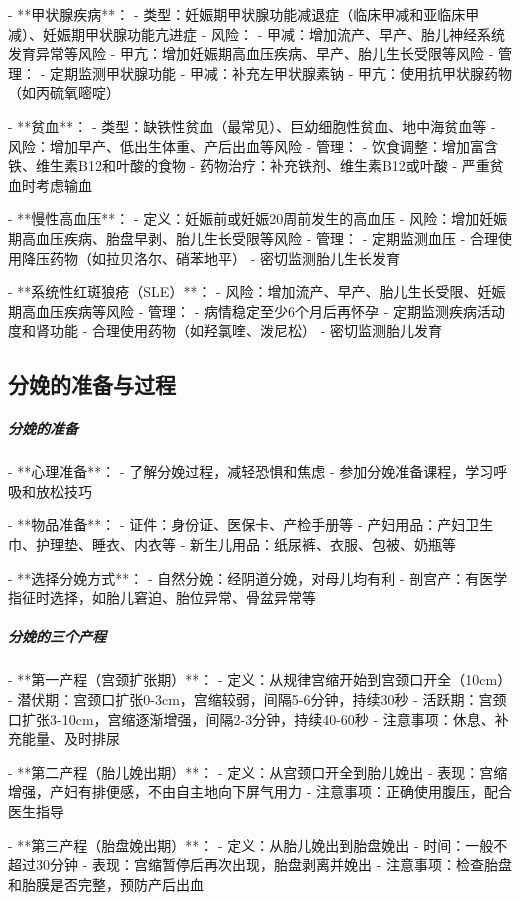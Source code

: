 \begin{enumerate}
- **甲状腺疾病**：
  - 类型：妊娠期甲状腺功能减退症（临床甲减和亚临床甲减）、妊娠期甲状腺功能亢进症
  - 风险：
    - 甲减：增加流产、早产、胎儿神经系统发育异常等风险
    - 甲亢：增加妊娠期高血压疾病、早产、胎儿生长受限等风险
  - 管理：
    - 定期监测甲状腺功能
    - 甲减：补充左甲状腺素钠
    - 甲亢：使用抗甲状腺药物（如丙硫氧嘧啶）

- **贫血**：
  - 类型：缺铁性贫血（最常见）、巨幼细胞性贫血、地中海贫血等
  - 风险：增加早产、低出生体重、产后出血等风险
  - 管理：
    - 饮食调整：增加富含铁、维生素B12和叶酸的食物
    - 药物治疗：补充铁剂、维生素B12或叶酸
    - 严重贫血时考虑输血

- **慢性高血压**：
  - 定义：妊娠前或妊娠20周前发生的高血压
  - 风险：增加妊娠期高血压疾病、胎盘早剥、胎儿生长受限等风险
  - 管理：
    - 定期监测血压
    - 合理使用降压药物（如拉贝洛尔、硝苯地平）
    - 密切监测胎儿生长发育

- **系统性红斑狼疮（SLE）**：
  - 风险：增加流产、早产、胎儿生长受限、妊娠期高血压疾病等风险
  - 管理：
    - 病情稳定至少6个月后再怀孕
    - 定期监测疾病活动度和肾功能
    - 合理使用药物（如羟氯喹、泼尼松）
    - 密切监测胎儿发育

\subsection{分娩的准备与过程}

\subparagraph{分娩的准备}

- **心理准备**：
  - 了解分娩过程，减轻恐惧和焦虑
  - 参加分娩准备课程，学习呼吸和放松技巧

- **物品准备**：
  - 证件：身份证、医保卡、产检手册等
  - 产妇用品：产妇卫生巾、护理垫、睡衣、内衣等
  - 新生儿用品：纸尿裤、衣服、包被、奶瓶等

- **选择分娩方式**：
  - 自然分娩：经阴道分娩，对母儿均有利
  - 剖宫产：有医学指征时选择，如胎儿窘迫、胎位异常、骨盆异常等

\subparagraph{分娩的三个产程}

- **第一产程（宫颈扩张期）**：
  - 定义：从规律宫缩开始到宫颈口开全（10cm）
  - 潜伏期：宫颈口扩张0-3cm，宫缩较弱，间隔5-6分钟，持续30秒
  - 活跃期：宫颈口扩张3-10cm，宫缩逐渐增强，间隔2-3分钟，持续40-60秒
  - 注意事项：休息、补充能量、及时排尿

- **第二产程（胎儿娩出期）**：
  - 定义：从宫颈口开全到胎儿娩出
  - 表现：宫缩增强，产妇有排便感，不由自主地向下屏气用力
  - 注意事项：正确使用腹压，配合医生指导

- **第三产程（胎盘娩出期）**：
  - 定义：从胎儿娩出到胎盘娩出
  - 时间：一般不超过30分钟
  - 表现：宫缩暂停后再次出现，胎盘剥离并娩出
  - 注意事项：检查胎盘和胎膜是否完整，预防产后出血


\end{enumerate}

